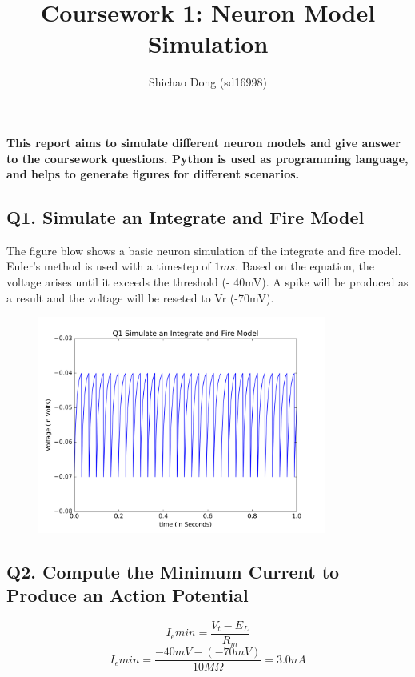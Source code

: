 \documentclass[DIV=calc, paper=a4, fontsize=12pt, twocolumn]{article}	 %
\title{Coursework 1: Neuron Model Simulation} %
\author{Shichao Dong (sd16998)} %
\date{\vspace{-30pt}} %
\newcommand{\initial}[1]{ %
	\lettrine[lines=3,lhang=0.3,nindent=0em]{
		\color{Black}
		{\textsf{#1}}}{}}
\begin{document}
	
	\maketitle %
	
	\thispagestyle{fancy} %
	
	
	\textbf{This report aims to simulate different neuron models and give answer to the coursework questions. Python is used as programming language, and helps to generate figures for different scenarios.}

	\subsection*{Q1. Simulate an Integrate and Fire Model}
			The figure blow shows a basic neuron simulation of the integrate and fire model. Euler's method is used with a timestep of $1 ms$.  Based on the equation, the voltage arises until it exceeds the threshold (- 40mV). A spike will be produced as a result and the voltage will be reseted to Vr (-70mV).
           
        \begin{figure}[H]
			\includegraphics*[width = 9.5cm]{Q1}
		\end{figure}
	
	\bigskip	
	\subsection*{Q2. Compute the Minimum Current to Produce an Action Potential}
		\begin{equation}
			I_emin = \dfrac{V_t - E_L}{R_m}
		\end{equation}
		\begin{equation}
			I_emin = \dfrac{-40 mV - (-70 mV)}{10M\Omega} = 3.0nA
		\end{equation}
	\bigskip	
\end{document}
